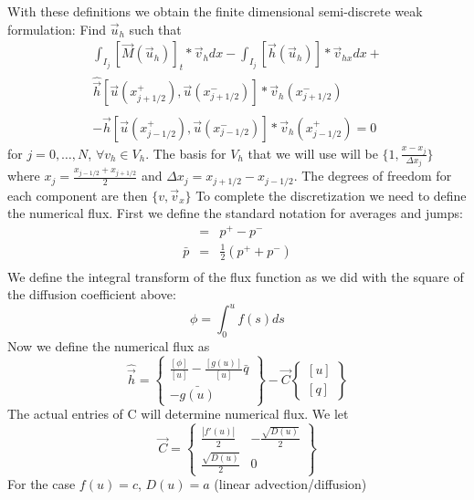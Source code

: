\documentclass[10pt,dvips,twoside,reqno]{amsart}
\begin{document}
With these definitions we obtain the finite dimensional semi-discrete weak formulation: Find $\vec u_h$ such that
\begin{eqnarray}
&\int_{I_j} [\vec M(\vec u_h)]_t * \vec v_h dx - \int_{I_j} [\vec h(\vec u_h)] * \vec v_{hx} dx
+&\\
&\hat{\vec h}[\vec u(x^+_{j+1/2}),\vec u(x^-_{j+1/2})]* \vec v_h(x^-_{j+1/2}) &\\
&-\hat{\vec h}[\vec u(x^+_{j-1/2}),\vec u(x^-_{j-1/2})]* \vec v_h(x^+_{j-1/2}) = 0 &
\end{eqnarray}
for $j=0,\ldots,N$, $\forall v_h \in V_h$. The basis for $V_h$ that we
will use will be $\{1,\frac{x-x_j}{\Delta x_j} \}$ where $x_j =
\frac{x_{j-1/2}+x_{j+1/2}}{2}$ and $\Delta x_j=x_{j+1/2}-x_{j-1/2}$.
The degrees of freedom for each component are then $\{v, \vec v_x\}$
To complete the discretization we need to define the numerical flux. First we define the standard notation for averages and jumps:
\begin{eqnarray}
[p]&=&p^+ -  p^- \\
\bar{p} &=& \frac{1}{2} (p^+ + p^-) \\
\end{eqnarray}
We define the integral transform of the flux function as we did with the square of the diffusion coefficient above:
\begin{equation}
\phi = \int_0^u f(s) ds 
\end{equation}
Now we define the numerical flux as
\begin{equation}
\hat{\vec h} = 
\left\{
\begin{array}{c}
\frac{ \left[ \phi \right] }{ \left[ u \right] } - \frac{ \left[ g(u) \right] }{ \left[ u \right] } \bar{q} \\
- \bar{g(u)} 
\end{array}
\right\}
- \vec C 
\left\{
\begin{array}{c}
\left[ u \right] \\
\left[ q \right] 
\end{array}
\right\}
\end{equation}
The actual entries of C will determine numerical flux. We let
\begin{equation}
\vec C = \left\{
\begin{array}{cc}
\frac{|f'(u)|}{2} & -\frac{\sqrt{D(u)}}{2} \\
\frac{\sqrt{D(u)}}{2} & 0 
\end{array}
\right\}
\end{equation}
For the case $f(u) = c$, $D(u)=a$ (linear advection/diffusion)
\end{document}

